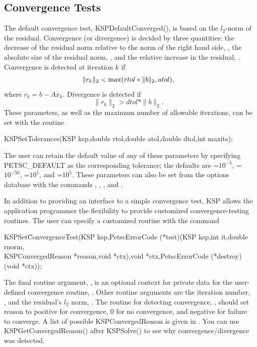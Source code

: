 \subsection{Convergence Tests}
\label{section_convergencetests}

The default convergence test, KSPDefaultConverged(), is 
based on the $l_2$-norm of the residual. Convergence 
(or divergence) is decided by three quantities:
the decrease of the residual norm relative to the norm of the right hand side, , the absolute 
size of the residual norm, , and the relative increase in the 
residual, .  Convergence is detected at iteration $ k $ if
\[  \| r_k \|_2 < {\rm max} ( rtol * \| b \|_2, atol), \]
where $r_k = b - A x_k$.  Divergence is detected if
\[  \| r_k \|_2 > dtol * \| b \|_2. \]
These parameters, as well as the maximum number of allowable iterations, 
can be set with the routine 
\begin{tabbing}
  KSPSetTolerances(KSP ksp,double rtol,double atol,double dtol,int maxits);
\end{tabbing}
The user can retain the default value of any of these parameters by
specifying PETSC_DEFAULT as the 
corresponding tolerance; the
defaults are =$10^{-5}$, =$10^{-50}$,
=$10^{5}$, and =$10^5$.
These parameters can also be set from the options database with the 
commands  ,  ,  ,
  
and  . 

In addition to providing an interface to a simple convergence test,
KSP allows the application programmer the flexibility to provide 
customized convergence-testing routines.  
The user can specify a customized 
routine with the command 
\begin{tabbing}
  KSPSet\=ConvergenceTest(KSP ksp,PetscErrorCode (*test)(KSP ksp,int it,double rnorm,\\
          \>KSPConvergedReason *reason,void *ctx),void *ctx,PetscErrorCode (*destroy)(void *ctx));
\end{tabbing}
The final routine argument, , is an optional context for private
data for the user-defined convergence routine, .  Other
 routine arguments are the iteration
number, , and the residual's $ l_2 $ norm, .
The routine for detecting convergence, , should set reason to 
positive for convergence, 0 for no convergence, and negative for 
failure to converge.  A list of possible KSPConvergedReason is given
in .
 You can use KSPGetConvergedReason() after KSPSolve() to see why
convergence/divergence was detected.

